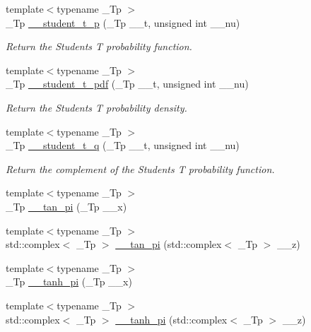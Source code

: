 \begin{DoxyCompactItemize}
\item 
{\footnotesize template$<$typename \+\_\+\+Tp $>$ }\\\+\_\+\+Tp \hyperlink{namespacestd_1_1____detail_ab9bb02e26c61e3d9dda4738ed4174338}{\+\_\+\+\_\+student\+\_\+t\+\_\+p} (\+\_\+\+Tp \+\_\+\+\_\+t, unsigned int \+\_\+\+\_\+nu)
\begin{DoxyCompactList}\small\item\em Return the Students T probability function. \end{DoxyCompactList}\item 
{\footnotesize template$<$typename \+\_\+\+Tp $>$ }\\\+\_\+\+Tp \hyperlink{namespacestd_1_1____detail_a866bf8f03fd2d5de5024837727beecd8}{\+\_\+\+\_\+student\+\_\+t\+\_\+pdf} (\+\_\+\+Tp \+\_\+\+\_\+t, unsigned int \+\_\+\+\_\+nu)
\begin{DoxyCompactList}\small\item\em Return the Students T probability density. \end{DoxyCompactList}\item 
{\footnotesize template$<$typename \+\_\+\+Tp $>$ }\\\+\_\+\+Tp \hyperlink{namespacestd_1_1____detail_aa430c479c2f41513393d7cb946d260c3}{\+\_\+\+\_\+student\+\_\+t\+\_\+q} (\+\_\+\+Tp \+\_\+\+\_\+t, unsigned int \+\_\+\+\_\+nu)
\begin{DoxyCompactList}\small\item\em Return the complement of the Students T probability function. \end{DoxyCompactList}\item 
{\footnotesize template$<$typename \+\_\+\+Tp $>$ }\\\+\_\+\+Tp \hyperlink{namespacestd_1_1____detail_a72fd3b7fcf9f49ade9411d782e8dbe4e}{\+\_\+\+\_\+tan\+\_\+pi} (\+\_\+\+Tp \+\_\+\+\_\+x)
\item 
{\footnotesize template$<$typename \+\_\+\+Tp $>$ }\\std\+::complex$<$ \+\_\+\+Tp $>$ \hyperlink{namespacestd_1_1____detail_ae19d579db4245c9c4e53a70a0513bb00}{\+\_\+\+\_\+tan\+\_\+pi} (std\+::complex$<$ \+\_\+\+Tp $>$ \+\_\+\+\_\+z)
\item 
{\footnotesize template$<$typename \+\_\+\+Tp $>$ }\\\+\_\+\+Tp \hyperlink{namespacestd_1_1____detail_ab0c02d3c15b8297df52b74807f22169b}{\+\_\+\+\_\+tanh\+\_\+pi} (\+\_\+\+Tp \+\_\+\+\_\+x)
\item 
{\footnotesize template$<$typename \+\_\+\+Tp $>$ }\\std\+::complex$<$ \+\_\+\+Tp $>$ \hyperlink{namespacestd_1_1____detail_a75775747d40813d5d54c0b7a7d0c39f0}{\+\_\+\+\_\+tanh\+\_\+pi} (std\+::complex$<$ \+\_\+\+Tp $>$ \+\_\+\+\_\+z)

\end{DoxyCompactItemize}
